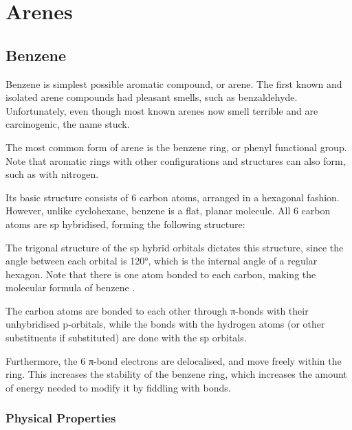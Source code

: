 

\pagebreak
\section{Arenes}

\subsection{Benzene}

	Benzene is simplest possible aromatic compound, or arene. The first known and isolated arene compounds had pleasant smells,
	such as benzaldehyde. Unfortunately, even though most known arenes now smell terrible and are carcinogenic, the name stuck.


	The most common form of arene is the benzene ring, or phenyl functional group. Note that aromatic rings with other configurations
	and structures can also form, such as with nitrogen.

	Its basic structure consists of 6 carbon atoms, arranged in a hexagonal fashion. However, unlike cyclohexane, benzene is a flat,
	planar molecule. All 6 carbon atoms are sp hybridised, forming the following structure:


	The trigonal structure of the sp hybrid orbitals dictates this structure, since the angle between each orbital is \ang{120},
	which is the internal angle of a regular hexagon. Note that there is one  atom bonded to each carbon, making the molecular
	formula of benzene .

	The carbon atoms are bonded to each other through π-bonds with their unhybridised p-orbitals, while the bonds with the hydrogen
	atoms (or other substituents if substituted) are done with the sp orbitals.

	Furthermore, the 6 π-bond electrons are delocalised, and move freely within the ring. This increases the stability of the benzene
	ring, which increases the amount of energy needed to modify it by fiddling with bonds.


	\subsubsection{Physical Properties}

